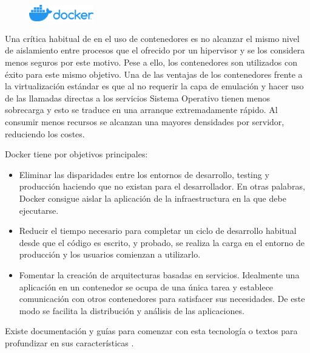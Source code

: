 \begin{figure}
    \centering
    \includegraphics[width=0.25\textwidth]{imaxes/e-fundamentos-tecnologicos/logo-docker.png}
\end{figure}

Una crítica habitual de en el uso de contenedores es no alcanzar el mismo nivel de aislamiento entre procesos que el ofrecido por un hipervisor y se los considera menos seguros por este motivo. Pese a ello, los contenedores son utilizados con éxito para este mismo objetivo. Una de las ventajas de los contenedores frente a la virtualización estándar es que al no requerir la capa de emulación y hacer uso de las llamadas directas a los servicios Sistema Operativo tienen menos sobrecarga y esto se traduce en una arranque extremadamente rápido. Al consumir menos recursos se alcanzan una mayores densidades por servidor, reduciendo los costes.

Docker tiene por objetivos principales:
\begin{itemize}
    \item Eliminar las disparidades entre los entornos de desarrollo, testing y producción haciendo que no existan para el desarrollador. En otras palabras, Docker consigue aislar la aplicación de la infraestructura en la que debe ejecutarse.
    \item Reducir el tiempo necesario para completar un ciclo de desarrollo habitual desde que el código es escrito, y probado, se realiza la carga en el entorno de producción y los usuarios comienzan a utilizarlo.
    \item Fomentar la creación de arquitecturas basadas en servicios. Idealmente una aplicación en un contenedor se ocupa de una única tarea y establece comunicación con otros contenedores para satisfacer sus necesidades. De este modo se facilita la distribución y análisis de las aplicaciones.
\end{itemize}

Existe documentación y guías para comenzar con esta tecnología \cite{dockerInc_web_startGuides} o textos para profundizar en sus características \cite{turnbull_book_dockerBook}.

